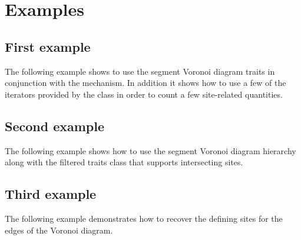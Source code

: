
\section{Examples}
\label{sec:segvor2-examples}

\subsection{First example}

The following example shows to use the segment Voronoi diagram traits
in conjunction with the  mechanism. In
addition it shows how to use a few of the iterators provided by the
 class in order to count a few
site-related quantities.


\subsection{Second example}

The following example shows how to use the segment Voronoi diagram
hierarchy along with the filtered traits class that supports
intersecting sites.


\subsection{Third example}

The following example demonstrates how to recover the defining sites
for the edges of the Voronoi diagram.


